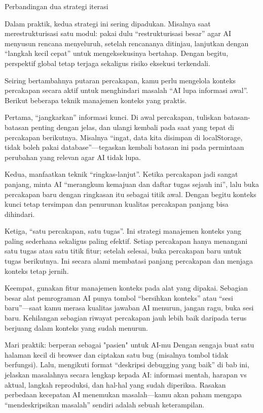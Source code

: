 \begin{center}\small\color{gray}Perbandingan dua strategi iterasi\end{center}

Dalam praktik, kedua strategi ini sering dipadukan. Misalnya saat merestrukturisasi satu modul: pakai dulu “restrukturisasi besar” agar AI menyusun rencana menyeluruh, setelah rencananya ditinjau, lanjutkan dengan “langkah kecil cepat” untuk mengeksekusinya bertahap. Dengan begitu, perspektif global tetap terjaga sekaligus risiko eksekusi terkendali.


Seiring bertambahnya putaran percakapan, kamu perlu mengelola konteks percakapan secara aktif untuk menghindari masalah “AI lupa informasi awal”. Berikut beberapa teknik manajemen konteks yang praktis.

Pertama, “jangkarkan” informasi kunci. Di awal percakapan, tuliskan batasan-batasan penting dengan jelas, dan ulangi kembali pada saat yang tepat di percakapan berikutnya. Misalnya “ingat, data kita disimpan di localStorage, tidak boleh pakai database”—tegaskan kembali batasan ini pada permintaan perubahan yang relevan agar AI tidak lupa.

Kedua, manfaatkan teknik “ringkas-lanjut”. Ketika percakapan jadi sangat panjang, minta AI “merangkum kemajuan dan daftar tugas sejauh ini”, lalu buka percakapan baru dengan ringkasan itu sebagai titik awal. Dengan begitu konteks kunci tetap tersimpan dan penurunan kualitas percakapan panjang bisa dihindari.

Ketiga, “satu percakapan, satu tugas”. Ini strategi manajemen konteks yang paling sederhana sekaligus paling efektif. Setiap percakapan hanya menangani satu tugas atau satu titik fitur; setelah selesai, buka percakapan baru untuk tugas berikutnya. Ini secara alami membatasi panjang percakapan dan menjaga konteks tetap jernih.

Keempat, gunakan fitur manajemen konteks pada alat yang dipakai. Sebagian besar alat pemrograman AI punya tombol “bersihkan konteks” atau “sesi baru”—saat kamu merasa kualitas jawaban AI menurun, jangan ragu, buka sesi baru. Kehilangan sebagian riwayat percakapan jauh lebih baik daripada terus berjuang dalam konteks yang sudah menurun.

\begin{tcbpractice}{Mari praktik: berperan sebagai "pasien" untuk AI-mu}
Dengan sengaja buat satu halaman kecil di browser dan ciptakan satu bug (misalnya tombol tidak berfungsi). Lalu, mengikuti format “deskripsi debugging yang baik” di bab ini, jelaskan masalahnya secara lengkap kepada AI: informasi mentah, harapan vs aktual, langkah reproduksi, dan hal-hal yang sudah diperiksa. Rasakan perbedaan kecepatan AI menemukan masalah—kamu akan paham mengapa “mendeskripsikan masalah” sendiri adalah sebuah keterampilan.

\end{tcbpractice}

